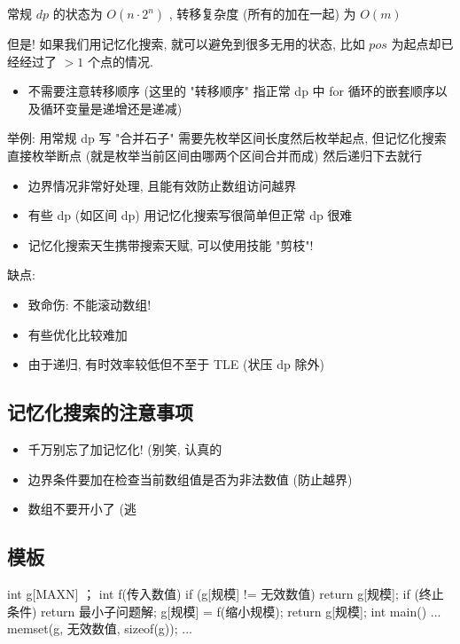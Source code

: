常规 $dp$ 的状态为 $O(n\cdot 2^n)$ , 转移复杂度 (所有的加在一起) 为 $O(m)$

但是! 如果我们用记忆化搜索, 就可以避免到很多无用的状态, 比如 $pos$ 为起点却已经经过了 $>1$ 个点的情况.

\begin{itemize}
\item 不需要注意转移顺序 (这里的 "转移顺序" 指正常 dp 中 for 循环的嵌套顺序以及循环变量是递增还是递减)
\end{itemize}

举例: 用常规 dp 写 "合并石子" 需要先枚举区间长度然后枚举起点, 但记忆化搜索直接枚举断点 (就是枚举当前区间由哪两个区间合并而成) 然后递归下去就行

\begin{itemize}
\item 边界情况非常好处理, 且能有效防止数组访问越界
\item 有些 dp (如区间 dp) 用记忆化搜索写很简单但正常 dp 很难
\item 记忆化搜索天生携带搜索天赋, 可以使用技能 "剪枝"!
\end{itemize}

缺点:

\begin{itemize}
\item 致命伤: 不能滚动数组!
\item 有些优化比较难加
\item 由于递归, 有时效率较低但不至于 TLE (状压 dp 除外)
\end{itemize}

\hr

\subsection{记忆化搜索的注意事项}

\begin{itemize}
\item 千万别忘了加记忆化! (别笑, 认真的
\item 边界条件要加在检查当前数组值是否为非法数值 (防止越界)
\item 数组不要开小了 (逃
\end{itemize}

\subsection{模板}

\begin{cppcode}
int g[MAXN] ； int f(传入数值) {
  if (g[规模] != 无效数值) return g[规模];
  if (终止条件) return 最小子问题解;
  g[规模] = f(缩小规模);
  return g[规模];
}
int main() {
  ... memset(g, 无效数值, sizeof(g));
  ...
}
\end{cppcode}
